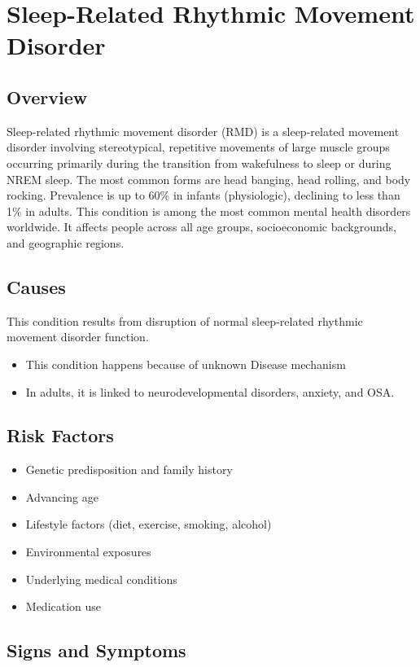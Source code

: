 \chapter{Sleep-Related Rhythmic Movement Disorder}
\label{sec:Sleep-Related Rhythmic Movement Disorder}

\section{Overview}
Sleep-related rhythmic movement disorder (RMD) is a sleep-related movement disorder involving stereotypical, repetitive movements of large muscle groups occurring primarily during the transition from wakefulness to sleep or during NREM sleep. The most common forms are head banging, head rolling, and body rocking. Prevalence is up to 60\% in infants (physiologic), declining to less than 1\% in adults. This condition is among the most common mental health disorders worldwide. It affects people across all age groups, socioeconomic backgrounds, and geographic regions.
\section{Causes}
This condition results from disruption of normal sleep-related rhythmic movement disorder function.

\begin{itemize}[noitemsep]
  \item This condition happens because of unknown Disease mechanism
  \item In adults, it is linked to neurodevelopmental disorders, anxiety, and OSA.
\end{itemize}
\section{Risk Factors}


\begin{itemize}[noitemsep]
  \item Genetic predisposition and family history
  \item Advancing age
  \item Lifestyle factors (diet, exercise, smoking, alcohol)
  \item Environmental exposures
  \item Underlying medical conditions
  \item Medication use
\end{itemize}
\section{Signs and Symptoms}

